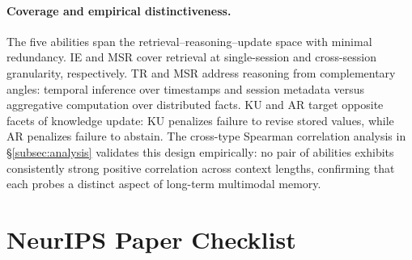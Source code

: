 \documentclass{article}
\begin{document}
\paragraph{Coverage and empirical distinctiveness.}
The five abilities span the retrieval--reasoning--update space with minimal redundancy. IE and MSR cover retrieval at single-session and cross-session granularity, respectively. TR and MSR address reasoning from complementary angles: temporal inference over timestamps and session metadata versus aggregative computation over distributed facts. KU and AR target opposite facets of knowledge update: KU penalizes failure to revise stored values, while AR penalizes failure to abstain. The cross-type Spearman correlation analysis in \S\ref{subsec:analysis} validates this design empirically: no pair of abilities exhibits consistently strong positive correlation across context lengths, confirming that each probes a distinct aspect of long-term multimodal memory.

\iffalse %
\newpage

\section{NeurIPS Paper Checklist}
\label{app:checklist}
\end{document}

